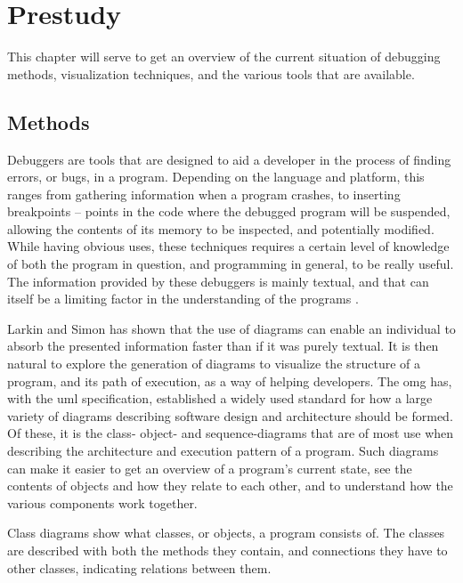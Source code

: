 \chapter{Prestudy}\label{prestudy}%

This chapter will serve to get an overview of the current situation of debugging methods, visualization techniques, and the various tools that are available.

\section{Methods}\label{preMethods}

Debuggers are tools that are designed to aid a developer in the process of finding errors, or bugs, in a program.
Depending on the language and platform, this ranges from gathering information when a program crashes, to inserting \glspl{breakpoint} -- points in the code where the debugged program will be suspended, allowing the contents of its memory to be inspected, and potentially modified.
While having obvious uses, these techniques requires a certain level of knowledge of both the program in question, and programming in general, to be really useful.
The information provided by these debuggers is mainly textual, and that can itself be a limiting factor in the understanding of the programs \cite{Larkin1987}.

Larkin and Simon has shown that the use of diagrams can enable an individual to absorb the presented information faster than if it was purely textual.
It is then natural to explore the generation of diagrams to visualize the structure of a program, and its path of execution, as a way of helping developers.
The \gls{omg} has, with the \gls{uml} specification, established a widely used standard for how a large variety of diagrams describing software design and architecture should be formed.
Of these, it is the class- object- and sequence-diagrams that are of most use when describing the architecture and execution pattern of a program. %
Such diagrams can make it easier to get an overview of a program's current state, see the contents of objects and how they relate to each other, and to understand how the various components work together.

Class diagrams show what classes, or objects, a program consists of.
The classes are described with both the methods they contain, and connections they have to other classes, indicating relations between them.


